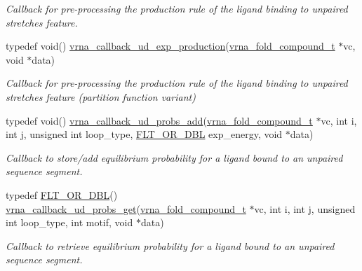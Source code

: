 \begin{DoxyCompactItemize}
\begin{DoxyCompactList}\small\item\em Callback for pre-\/processing the production rule of the ligand binding to unpaired stretches feature. \end{DoxyCompactList}\item 
typedef void() \mbox{\hyperlink{group__domains__up_ga33d78327dcd04c1ca5ab2887edc18c7b}{vrna\+\_\+callback\+\_\+ud\+\_\+exp\+\_\+production}}(\mbox{\hyperlink{group__fold__compound_ga1b0cef17fd40466cef5968eaeeff6166}{vrna\+\_\+fold\+\_\+compound\+\_\+t}} $\ast$vc, void $\ast$data)
\begin{DoxyCompactList}\small\item\em Callback for pre-\/processing the production rule of the ligand binding to unpaired stretches feature (partition function variant) \end{DoxyCompactList}\item 
typedef void() \mbox{\hyperlink{group__domains__up_gab10498abc84fcaf336aca8f8d7d42eb2}{vrna\+\_\+callback\+\_\+ud\+\_\+probs\+\_\+add}}(\mbox{\hyperlink{group__fold__compound_ga1b0cef17fd40466cef5968eaeeff6166}{vrna\+\_\+fold\+\_\+compound\+\_\+t}} $\ast$vc, int i, int j, unsigned int loop\+\_\+type, \mbox{\hyperlink{group__data__structures_ga31125aeace516926bf7f251f759b6126}{F\+L\+T\+\_\+\+O\+R\+\_\+\+D\+BL}} exp\+\_\+energy, void $\ast$data)
\begin{DoxyCompactList}\small\item\em Callback to store/add equilibrium probability for a ligand bound to an unpaired sequence segment. \end{DoxyCompactList}\item 
typedef \mbox{\hyperlink{group__data__structures_ga31125aeace516926bf7f251f759b6126}{F\+L\+T\+\_\+\+O\+R\+\_\+\+D\+BL}}() \mbox{\hyperlink{group__domains__up_gaa10ba1b6f1e179ea84c5caca9cdaae67}{vrna\+\_\+callback\+\_\+ud\+\_\+probs\+\_\+get}}(\mbox{\hyperlink{group__fold__compound_ga1b0cef17fd40466cef5968eaeeff6166}{vrna\+\_\+fold\+\_\+compound\+\_\+t}} $\ast$vc, int i, int j, unsigned int loop\+\_\+type, int motif, void $\ast$data)
\begin{DoxyCompactList}\small\item\em Callback to retrieve equilibrium probability for a ligand bound to an unpaired sequence segment. \end{DoxyCompactList}\end{DoxyCompactItemize}
